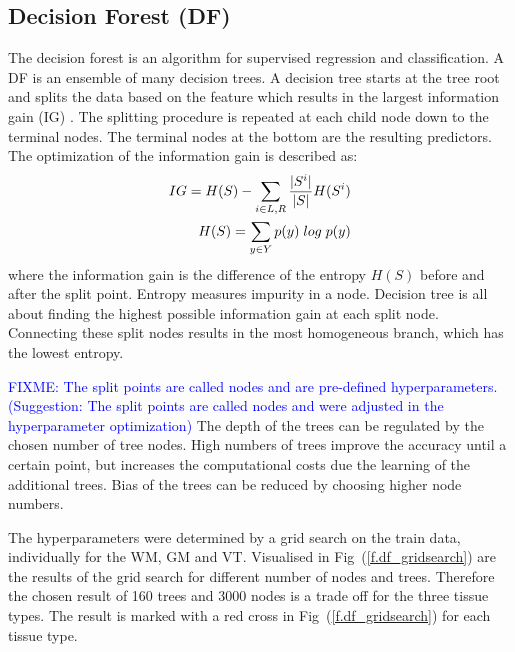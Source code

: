 \documentclass[journal]{IEEEtran}
\newcommand\FIXME[1]{\textcolor{blue}{FIXME: #1}}
\begin{document}
\subsection{Decision Forest (DF)}
The decision forest is an algorithm for supervised regression and classification. A DF is an ensemble of many decision trees. A decision tree starts at the tree root and splits the data based on the feature which results in the largest information gain (IG) . The splitting procedure is repeated at each child node down to the terminal nodes. The terminal nodes at the bottom are the resulting predictors. The optimization of the information gain is described as:
\begin{equation}
	\begin{split}
		IG = H(S) -\sum_{i \in {L,R}} \frac{ \vert S ^i \vert}{\vert S \vert} H(S^i) \\
		H(S) = \sum_{y \in Y} p(y) \hspace{0.1 cm} log \hspace{0.1 cm}  p(y)\\
	\end{split}
\end{equation}
where the information gain is the difference of the entropy $H(S)$ before and after the split point. Entropy measures impurity in a node. Decision tree is all about finding the highest possible information gain at each split node. Connecting these split nodes results in the most homogeneous branch, which has the lowest entropy.

\FIXME{The split points are called nodes and are pre-defined hyperparameters. (Suggestion: The split points are called nodes and were adjusted in the hyperparameter optimization)} The depth of the trees can be regulated by the chosen number of tree nodes. High numbers of trees improve the accuracy until a certain point, but increases the computational costs due the learning of the additional trees. Bias of the trees can be reduced by choosing higher node numbers.

The hyperparameters were determined by a grid search on the train data, individually for the WM, GM and VT. Visualised in Fig~(\ref{f.df_gridsearch}) are the results of the grid search for different number of nodes and trees. Therefore the chosen result of 160 trees and 3000 nodes is a trade off for the three tissue types. The result is marked with a red cross in Fig~(\ref{f.df_gridsearch})  for each tissue type.
\end{document}
